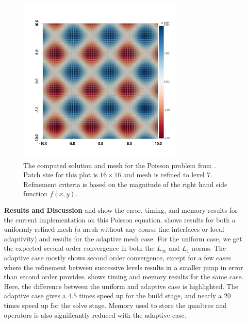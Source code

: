 \begin{figure}
    \centering
    \includegraphics[width=0.75\textwidth, trim={0 100 0 0}]{figures/plot_poisson.png}
    \caption{The computed solution and mesh for the Poisson problem from .  Patch size for this plot is $16 \times 16$ and mesh is refined to level 7.  Refinement criteria is based on the magnitude of the right hand side function $f(x,y)$.}
    \label{fig:poisson_plot}
\end{figure}

{\bf Results and Discussion}
 and  show the error, timing, and memory results for the current implementation on this Poisson equation.  shows results for both a uniformly refined mesh (a mesh without any coarse-fine interfaces or local adaptivity) and results for the adaptive mesh case. For the uniform case, we get the expected second order convergence in both the $L_{\infty}$ and $L_1$ norms. The adaptive case mostly shows second order convergence, except for a few cases where the refinement between successive levels results in a smaller jump in error than second order provides.  shows timing and memory results for the same case. Here, the difference between the uniform and adaptive case is highlighted. The adaptive case gives a $4.5$ times speed up for the build stage, and nearly a $20$ times speed up for the solve stage. Memory used to store the quadtree and operators is also significantly reduced with the adaptive case.

